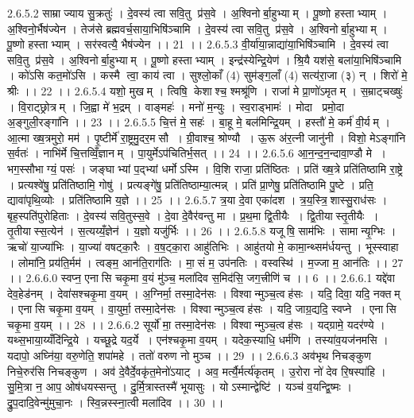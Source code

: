 2.6.5.2
साम्राज्याय सु॒क्रतुः॑ । दे॒वस्य॑ त्वा सवि॒तु प्र॑स॒वे । अ॒श्विनोर्बा॒हुभ्याम् । पू॒ष्णो हस्ताभ्याम् । अ॒श्विनो॒र्भैष॑ज्येन । तेज॑से ब्रह्मवर्च॒साया॒भिषि॑ञ्चामि । दे॒वस्य॑ त्वा सवि॒तु प्र॑स॒वे । अ॒श्विनोर्बा॒हुभ्याम् । पू॒ष्णो हस्ताभ्याम् । सर॑स्वत्यै॒ भैष॑ज्येन ।। 21 ।।
2.6.5.3
वी॒र्या॑या॒न्नाद्या॑या॒भिषि॑ञ्चामि । दे॒वस्य॑ त्वा सवि॒तु प्र॑स॒वे । अ॒श्विनोर्बा॒हुभ्याम् । पू॒ष्णो हस्ताभ्याम् । इन्द्र॑स्येन्द्रि॒येण॑ । श्रि॒यै यश॑से॒ बला॑या॒भिषि॑ञ्चामि । को॑ऽसि कत॒मो॑ऽसि । कस्मै त्वा॒ काय॑ त्वा । सुश्लो॒काँ (4) सुम॑ङ्ग॒लाँ (4) सत्य॑रा॒जा (३) न् । शिरो॑ मे॒ श्रीः ।। 22 ।।
2.6.5.4
यशो॒ मुखम् । त्विषि॒ केशाश्च॒ श्मश्रू॑णि । राजा॑ मे प्रा॒णो॑ऽमृतम् । स॒म्राट्चख्षुः॑ । वि॒राट्छ्रोत्रम् । जि॒ह्वा मे॑ भ॒द्रम् । वाङ्महः॑ । मनो॑ म॒न्युः । स्व॒राड्भामः॑ । मोदा प्रमो॒दा अ॒ङ्गुली॒रङ्गा॑नि ।। 23 ।।
2.6.5.5
चि॒त्तं मे॒ सहः॑ । बा॒हू मे॒ बल॑मिन्द्रि॒यम् । हस्तौ॑ मे॒ कर्म॑ वी॒र्यम् । आ॒त्मा ख्ष॒त्रमुरो॒ मम॑ । पृ॒ष्टीर्मे॑ रा॒ष्ट्रमु॒दर॒मसौ । ग्री॒वाश्च॒ श्रोण्यौ । ऊ॒रू अ॑र॒त्नी जानु॑नी । विशो॒ मेऽङ्गा॑नि स॒र्वतः॑ । नाभि॑र्मे चि॒त्तव्विँ॒ज्ञानम् । पा॒युर्मेऽप॑चितिर्भ॒सत् ।। 24 ।।
2.6.5.6
आ॒न॒न्द॒न॒न्दावा॒ण्डौ मे । भग॒स्सौभाग्यं॒ पसः॑ । जङ्घाभ्यां प॒द्भ्यां धर्मोऽस्मि । वि॒शि राजा॒ प्रति॑ष्ठितः । प्रति॑ ख्ष॒त्रे प्रति॑तिष्ठामि रा॒ष्ट्रे । प्रत्यश्वे॑षु॒ प्रति॑तिष्ठामि॒ गोषु॑ । प्रत्यङ्गे॑षु॒ प्रति॑तिष्ठाम्या॒त्मन्न् । प्रति॑ प्रा॒णेषु॒ प्रति॑तिष्ठामि पु॒ष्टे । प्रति॒ द्यावा॑पृथि॒व्योः । प्रति॑तिष्ठामि य॒ज्ञे ।। 25 ।।
2.6.5.7
त्र॒या दे॒वा एका॑दश । त्र॒य॒स्त्रि॒॒शास्सु॒राध॑सः । बृह॒स्पति॑पुरोहिताः । दे॒वस्य॑ सवि॒तुस्स॒वे । दे॒वा दे॒वैर॑वन्तु मा । प्र॒थ॒मा द्वि॒तीयैः । द्वि॒तीयास्तृ॒तीयैः । तृ॒तीयास्स॒त्येन॑ । स॒त्यय्यँ॒ज्ञेन॑ । य॒ज्ञो यजु॑र्भिः ।। 26 ।।
2.6.5.8
यजू॑षि॒ साम॑भिः । सामान्यृ॒ग्भिः । ऋचो॑ या॒ज्या॑भिः । या॒ज्या॑ वषट्का॒रैः । व॒ष॒ट्का॒रा आहु॑तिभिः । आहु॑तयो मे॒ कामा॒न्थ्सम॑र्धयन्तु । भूस्स्वाहा । लोमा॑नि॒ प्रय॑ति॒र्मम॑ । त्वङ्म॒ आन॑ति॒राग॑तिः । मा॒॒सं म॒ उप॑नतिः । वस्वस्थि॑ । म॒ज्जा म॒ आन॑तिः ।। 27 ।।
2.6.6.0
स्वप्न॒ एना॑सि चकृ॒मा व॒यं मु॑ञ्च॒ मला॑दिव स॒मिद॑सि॒ जग॒त्त्रीणि॑ च ।। 6 ।।
2.6.6.1
यद्दे॑वा देव॒हेड॑नम् । देवा॑सश्चकृ॒मा व॒यम् । अ॒ग्निर्मा॒ तस्मा॒देन॑सः । विश्वान्मुञ्च॒त्वह॑सः । यदि॒ दिवा॒ यदि॒ नक्तम् । एना॑सि चकृ॒मा व॒यम् । वा॒युर्मा॒ तस्मा॒देन॑सः । विश्वान्मुञ्च॒त्वह॑सः । यदि॒ जाग्र॒द्यदि॒ स्वप्ने । एना॑सि चकृ॒मा व॒यम् ।। 28 ।।
2.6.6.2
सूर्यो॑ मा॒ तस्मा॒देन॑सः । विश्वान्मुञ्च॒त्वह॑सः । यद्ग्रामे॒ यदर॑ण्ये । यथ्स॒भाया॒य्यँदि॑न्द्रि॒ये । यच्छू॒द्रे यद॒र्ये । एन॑श्चकृ॒मा व॒यम् । यदेक॒स्याधि॒ धर्म॑णि । तस्या॑व॒यज॑नमसि । यदापो॒ अघ्नि॑या॒ वरु॒णेति॒ शपा॑महे । ततो॑ वरुण नो मुञ्च ।। 29 ।।
2.6.6.3
अव॑भृथ निचङ्कुण निचे॒रुर॑सि निचङ्कुण । अव॑ दे॒वैर्दे॒वकृ॑त॒मेनो॑ऽयाट् । अव॒ मर्त्यै॒र्मर्त्य॑कृतम् । उ॒रोरा नो॑ देव रि॒षस्पा॑हि । सु॒मि॒त्रा न॒ आप॒ ओष॑धयस्सन्तु । दु॒र्मि॒त्रास्तस्मै॑ भूयासुः । योऽस्मान्द्वेष्टि॑ । यञ्च॑ व॒यन्द्वि॒ष्मः । द्रु॒प॒दादि॒वेन्मु॑मुचा॒नः । स्वि॒न्नस्स्ना॒त्वी मला॑दिव ।। 30 ।।
